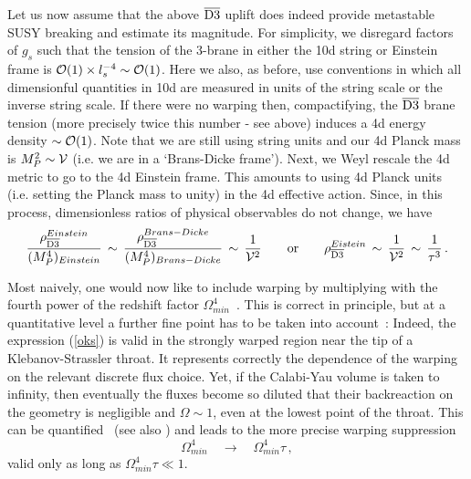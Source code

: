 \documentclass[12pt]{article}
\newcommand{\be}{\begin{equation}}
\newcommand{\ee}{\end{equation}}
\newcommand{\ol}{\overline}
\numberwithin{equation}{section}
\begin{document}
Let us now assume that the above $\ol{\rm D3}$ uplift does indeed provide metastable SUSY breaking and estimate its magnitude. For simplicity, we disregard factors of $g_s$ such that the tension of the 3-brane in either the 10d string or Einstein frame is ${\cal O}(1)\times l_s^{-4}\sim {\cal O}(1)$. Here we also, as before, use conventions in which all dimensionful quantities in 10d are measured in units of the string scale or the inverse string scale. If there were no warping then, compactifying, the $\ol{\rm D3}$ brane tension (more precisely twice this number - see above) induces a 4d energy density $\sim {\cal O}(1)$. Note that we are still using string units and our 4d Planck mass is $M_P^2\sim {\cal V}$ (i.e. we are in a `Brans-Dicke frame'). Next, we Weyl rescale the 4d metric to go to the 4d Einstein frame. This amounts to using 4d Planck units (i.e. setting the Planck mass to unity) in the 4d effective action. Since, in this process, dimensionless ratios of physical observables do not change, we have
\be
\frac{\rho_{\ol{\rm D3}}^{Einstein}}{(M_P^4)_{Einstein}} \,\sim\,\frac{\rho_{\ol{\rm D3}}^{Brans-Dicke}}{(M_P^4)_{Brans-Dicke}}
\,\sim\,\frac{1}{{\cal V}^2}\qquad \mbox{or}\qquad 
\rho_{\ol{\rm D3}}^{Eistein}\,\sim\,\frac{1}{{\cal V}^2}\,\sim\,\frac{1}{\tau^3}\,.
\ee

Most naively, one would now like to include warping by multiplying with the fourth power of the redshift factor $\Omega_{min}^4$~\cite{Kachru:2003aw}. This is correct in principle, but at a quantitative level a further fine point has to be taken into account~\cite{Kachru:2003sx}: Indeed, the expression (\ref{oks}) is valid in the strongly warped region near the tip of a Klebanov-Strassler throat. It represents correctly the dependence of the warping on the relevant discrete flux choice. Yet, if the Calabi-Yau volume is taken to infinity, then eventually the fluxes become so diluted that their backreaction on the geometry is negligible and $\Omega\sim 1$, even at the lowest point of the throat. This can be quantified~\cite{Kachru:2003sx} (see also \cite{Giddings:2005ff}) and leads to the more precise warping suppression 
\be
\Omega_{min}^4\quad\to\quad\Omega_{min}^4\tau\,,
\ee
valid only as long as $\Omega_{min}^4\tau\ll 1$. 
\end{document}
